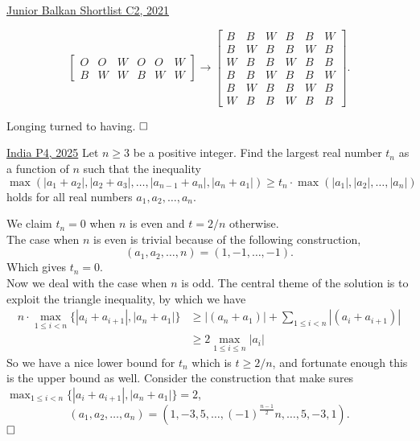 \begin{problem}{4}{\href{https://artofproblemsolving.com/community/c6h2876405p34326572}{Junior Balkan Shortlist C2, 2021}}
\begin{solution}
\begin{mycases}
$$\begin{bmatrix}
		O & O & W & O & O & W\\
		B & W & W & B & W & W
	\end{bmatrix}\to\begin{bmatrix}
		B & B & W & B & B & W\\
		B & W & B & B & W & B\\
		W & B & B & W & B & B\\
		B & B & W & B & B & W\\
		B & W & B & B & W & B\\
		W & B & B & W & B & B
	\end{bmatrix}. $$
\end{mycases}
Longing turned to having. $\qedwhite$

	\end{solution}
\end{problem} 

	
\begin{problem}{5}{\href{}{India P4, 2025}}
	Let $n\ge 3$ be a positive integer. Find the largest real number $t_n$ as a function of $n$ such that the inequality
\[\max\left(|a_1+a_2|, |a_2+a_3|, \dots ,|a_{n-1}+a_{n}| , |a_n+a_1|\right) \ge t_n \cdot \max(|a_1|,|a_2|, \dots ,|a_n|)\]holds for all real numbers $a_1, a_2, \dots , a_n$.
	\begin{solution} We claim $t_n=0$ when $n$ is even and $t=2/n$ otherwise.\\
	The case when $n$ is even is trivial because of the following construction,
$$(a_1,a_2,\ldots,n)=(1,-1,\ldots,-1).$$
	Which gives $t_n=0$.\\
	\indent Now we deal with the case when $n$ is odd. The central theme of the solution is to exploit the triangle inequality, by which we have
\begin{align*}
		n\cdot\max_{1\le i<n}\big\{|a_i+a_{i+1}|, |a_n+a_{1}|\big\} &\ge |(a_n+a_1)|+\sum_{1\le i<n}|(a_{i}+a_{i+1})|\\
		&\ge 2\max_{1\le i\le n}|a_i|
	\end{align*}
		So we have a nice lower bound for $t_n$ which is $t\ge 2/n$, and fortunate enough this is the upper bound as well. Consider the construction that make sures $\displaystyle \max_{1\le i<n}\big\{|a_i+a_{i+1}|, |a_n+a_{1}|\big\}=2$,
$$(a_1,a_2,\ldots,a_n)=(1,-3,5,\ldots,(-1)^{\frac{n-1}{2}}n,\ldots,5,-3,1).$$
	$\qedwhite$

	\end{solution}
\end{problem}

